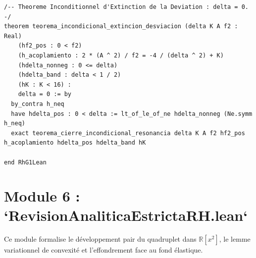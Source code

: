 \documentclass[11pt,a4paper]{article}
\theoremstyle{definition}
\theoremstyle{remark}
\begin{document}
\begin{lstlisting}[language=Lean4]
/-- Theoreme Inconditionnel d'Extinction de la Deviation : delta = 0. -/
theorem teorema_incondicional_extincion_desviacion (delta K A f2 : Real)
    (hf2_pos : 0 < f2)
    (h_acoplamiento : 2 * (A ^ 2) / f2 = -4 / (delta ^ 2) + K)
    (hdelta_nonneg : 0 <= delta)
    (hdelta_band : delta < 1 / 2)
    (hK : K < 16) :
    delta = 0 := by
  by_contra h_neq
  have hdelta_pos : 0 < delta := lt_of_le_of_ne hdelta_nonneg (Ne.symm h_neq)
  exact teorema_cierre_incondicional_resonancia delta K A f2 hf2_pos h_acoplamiento hdelta_pos hdelta_band hK

end RhG1Lean
\end{lstlisting}

\section{Module 6 : `RevisionAnaliticaEstrictaRH.lean`}

Ce module formalise le développement pair du quadruplet dans $\mathbb{R}[x^2]$, le lemme variationnel de convexité et l'effondrement face au fond élastique.
\end{document}
